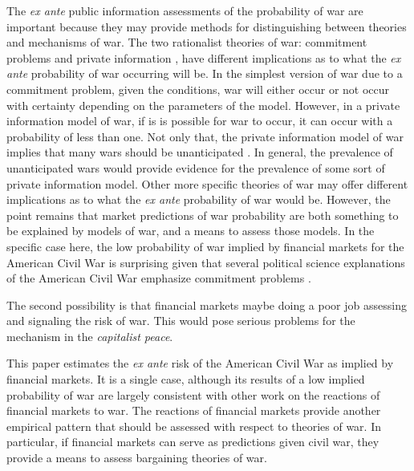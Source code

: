 The \textit{ex ante} public information assessments of the probability of war are important because they may provide methods for distinguishing between theories and mechanisms of war.
The two rationalist theories of war: commitment problems and private information \parencites{Fearon1995,Powell2006}, have different implications as to what the \textit{ex ante} probability of war occurring will be.
In the simplest version of war due to a commitment problem, given the conditions, war will either occur or not occur with certainty depending on the parameters of the model.
However, in a private information model of war, if is is possible for war to occur, it can occur with a probability of less than one.
Not only that, the private information model of war implies that many wars should be unanticipated \parencite{Gartzke1999}.
In general, the prevalence of unanticipated wars would provide evidence for the prevalence of some sort of private information model.
Other more specific theories of war may offer different implications as to what the \textit{ex ante} probability of war would be.
However, the point remains that market predictions of war probability are both something to be explained by models of war, and a means to assess those models.
In the specific case here, the low probability of war implied by financial markets for the American Civil War is surprising given that several political science  explanations of the American Civil War emphasize commitment problems \parencites{Reiter2009}{Weingast1998}.

The second possibility is that financial markets maybe doing a poor job assessing and signaling the risk of war.
This would pose serious problems for the mechanism in the \textit{capitalist peace}.

This paper estimates the \textit{ex ante} risk of the American Civil War as implied by financial markets.
It is a single case, although its results of a low implied probability of war are largely consistent with other work on the reactions of financial markets to war.
The reactions of financial markets provide another empirical pattern that should be assessed with respect to theories of war.
In particular, if financial markets can serve as predictions given civil war, they provide a means to assess bargaining theories of war.


